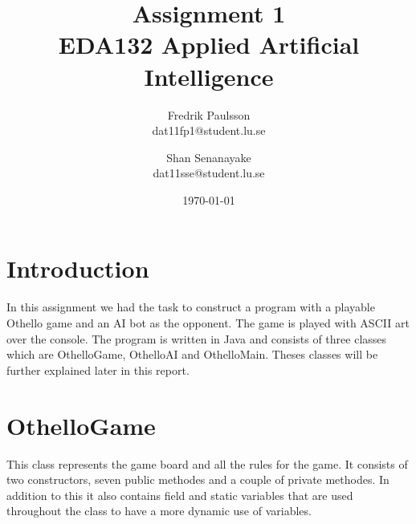 \documentclass[a4paper]{article}
\title{Assignment 1 \\ EDA132 Applied Artificial Intelligence}
\date{\today}
\author{Fredrik Paulsson \\ dat11fp1@student.lu.se \and Shan Senanayake \\ dat11sse@student.lu.se}
\begin{document}
\maketitle


\section{Introduction}
In this assignment we had the task to construct a program with a playable Othello game and an AI bot as the opponent. The game is played with ASCII art over the console. The program is written in Java and consists of three classes which are OthelloGame, OthelloAI and OthelloMain. Theses classes will be further explained later in this report. \\

\section{OthelloGame}
This class represents the game board and all the rules for the game. It consists of two constructors, seven public methodes and a couple of private methodes. In addition to this it also contains field and static variables that are used throughout the class to have a more dynamic use of variables.
\end{document}
